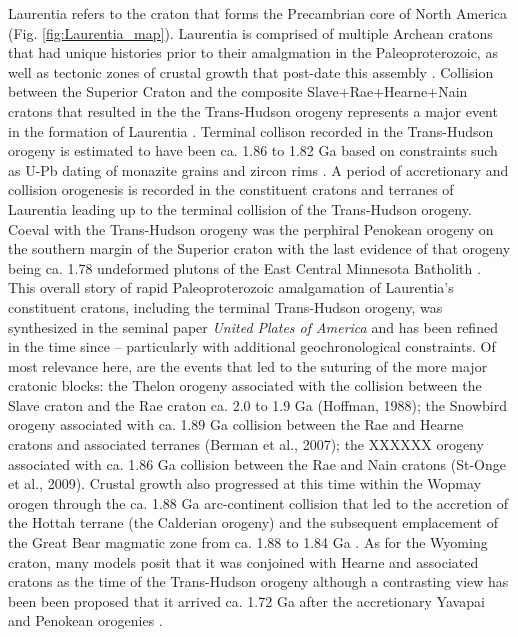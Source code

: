\documentclass[11pt,letterpaper]{article}
\begin{document}
Laurentia refers to the craton that forms the Precambrian core of North America (Fig. \ref{fig:Laurentia_map}). Laurentia is comprised of multiple Archean cratons that had unique histories prior to their amalgmation in the Paleoproterozoic, as well as tectonic zones of crustal growth that post-date this assembly \citep{Hoffman1988a, Whitmeyer2007a}. Collision between the Superior Craton and the composite Slave+Rae+Hearne+Nain cratons that resulted in the the Trans-Hudson orogeny represents a major event in the formation of Laurentia \citep{Corrigan2009a}. Terminal collison recorded in the Trans-Hudson orogeny is estimated to have been ca. 1.86 to 1.82 Ga based on constraints such as U-Pb dating of monazite grains and zircon rims \citep[e.g.]{Skipton2016a, Weller2017a}. A period of accretionary and collision orogenesis is recorded in the constituent cratons and terranes of Laurentia leading up to the terminal collision of the Trans-Hudson orogeny. Coeval with the Trans-Hudson orogeny was the perphiral Penokean orogeny on the southern margin of the Superior craton with the last evidence of that orogeny being ca. 1.78 undeformed plutons of the East Central Minnesota Batholith \citep{Holm2005a}. This overall story of rapid Paleoproterozoic amalgamation of Laurentia's constituent cratons, including the terminal Trans-Hudson orogeny, was synthesized in the seminal paper \textit{United Plates of America} \citep{Hoffman1988a} and has been refined in the time since -- particularly with additional geochronological constraints. Of most relevance here, are the events that led to the suturing of the more major cratonic blocks: the Thelon orogeny associated with the collision between the Slave craton and the Rae craton ca. 2.0 to 1.9 Ga (Hoffman, 1988); the Snowbird orogeny associated with ca. 1.89 Ga collision between the Rae and Hearne cratons and associated terranes (Berman et al., 2007); the XXXXXX orogeny associated with ca. 1.86 Ga collision between the Rae and Nain cratons (St-Onge et al., 2009). Crustal growth also progressed at this time within the Wopmay orogen through the ca. 1.88 Ga arc-continent collision that led to the accretion of the Hottah terrane (the Calderian orogeny) and the subsequent emplacement of the Great Bear magmatic zone from ca. 1.88 to 1.84 Ga \citep{Hildebrand2009a}. As for the Wyoming craton, many models posit that it was conjoined with Hearne and associated cratons as the time of the Trans-Hudson orogeny \citep[e.g.][]{St-Onge2009a, Pehrsson2015a} although a contrasting view has been been proposed that it arrived ca. 1.72 Ga after the accretionary Yavapai and Penokean orogenies \citep{Kilian2016a}. 
\end{document}
